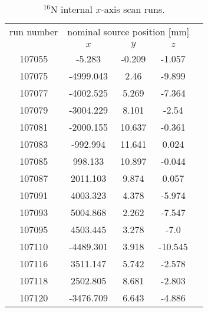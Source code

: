 \begin{table}[ht]
		\caption[$^{16}$N internal $x$-axis scan runs.]{$^{16}$N internal $x$-axis scan runs.\label{table:n16scanTable_xscan}}
		\vspace{2mm}
				\centering
    	\begin{tabular*}{90mm}{c@{\extracolsep{\fill}}*4c}
    		\toprule 
    		run number  & \multicolumn{3}{c}{nominal source position [mm]}\\
    		\cline{2-4}
    		& $x$ & $y$ & $z$\\   
       \midrule
       107055 &-5.283 & -0.209 & -1.057\\
       107075 & -4999.043 & 2.46 & -9.899\\
       107077 & -4002.525 & 5.269 & -7.364\\
       107079 & -3004.229 & 8.101 & -2.54\\
       107081 & -2000.155 & 10.637 & -0.361 \\
       107083 & -992.994 & 11.641 & 0.024 \\
       107085 & 998.133 & 10.897 & -0.044\\
       107087 & 2011.103 & 9.874 & 0.057\\
       107091 & 4003.323 &  4.378 &  -5.974\\
       107093 & 5004.868 & 2.262 & -7.547\\
       107095 & 4503.445 & 3.278 & -7.0\\
       107110 & -4489.301 & 3.918 & -10.545\\
       107116 & 3511.147 & 5.742 & -2.578\\
       107118 & 2502.805 & 8.681 & -2.803\\
       107120 & -3476.709 & 6.643 & -4.886\\
		\bottomrule	
	\end{tabular*}
\end{table}

